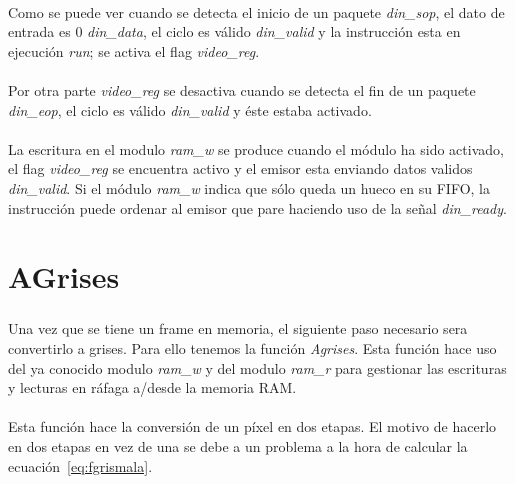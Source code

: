 \documentclass[a4paper,12pt,titlepage,final]{book}
\begin{document}
\paragraph{}
Como se puede ver cuando se detecta el inicio de un paquete \textit{din\_sop}, el dato de entrada es 0 \textit{din\_data}, el ciclo es válido \textit{din\_valid} y la instrucción esta en ejecución \textit{run}; se activa el flag \textit{video\_reg}.

\paragraph{}
Por otra parte \textit{video\_reg} se desactiva cuando se detecta el fin de un paquete \textit{din\_eop}, el ciclo es válido \textit{din\_valid} y éste estaba activado.



\paragraph{}
La escritura en el modulo \textit{ram\_w} se produce cuando el módulo ha sido activado, el flag \textit{video\_reg} se encuentra activo y el emisor esta enviando datos validos \textit{din\_valid}. Si el módulo \textit{ram\_w} indica que sólo queda un hueco en su FIFO, la instrucción puede ordenar al emisor que pare haciendo uso de la señal \textit{din\_ready}. 

\section{AGrises}
\subsubsection*{}
\paragraph{}
Una vez que se tiene un frame en memoria, el siguiente paso necesario sera convertirlo a grises. Para ello tenemos la función \textit{Agrises}. Esta función hace uso del ya conocido modulo \textit{ram\_w} y del modulo \textit{ram\_r} para gestionar las escrituras y lecturas en ráfaga a/desde la memoria RAM.

\paragraph{}
Esta función hace la conversión de un píxel en dos etapas. El motivo de hacerlo en dos etapas en vez de una se debe a un problema a la hora de calcular la ecuación~\ref{eq:fgrismala}.
\end{document}
